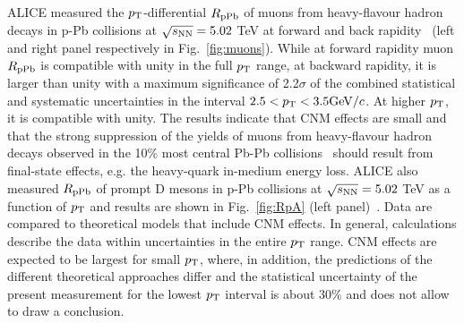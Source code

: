 ALICE measured the $p_{\rm T}$-differential $R_{\rm pPb}$ of muons from heavy-flavour hadron decays in p-Pb collisions at $\sqrt{s_{\rm NN}} = 5.02$ TeV
at forward and back rapidity~\cite{Acharya:2017hdv} (left and right panel respectively in Fig.~\ref{fig:muons}).
While at forward rapidity muon $R_{\rm pPb}$ is compatible with unity in the full $p_{\rm T}$ range, 
at backward rapidity, it is larger than unity with a maximum 
significance of 2.2$\sigma$ of the combined statistical and systematic uncertainties in the interval $2.5 < p_{\rm T} < 3.5 \mathrm{GeV}/c$. 
At higher $p_{\rm T}$, it is compatible with unity. The results indicate
that CNM effects are small and that the strong suppression of the
yields of muons from heavy-flavour hadron decays observed in the
10\% most central Pb-Pb collisions~\cite{Abelev:2012qh} should result from final-state
effects, e.g. the heavy-quark in-medium energy loss. 
ALICE also measured $R_{\rm pPb}$ of prompt D mesons in p-Pb collisions at $\sqrt{s_{\rm NN}} = 5.02$ TeV
as a function of $p_{\rm T}$ and results are shown in Fig.~\ref{fig:RpA} (left panel)~\cite{ALICEPAS2017008}. Data are compared to 
theoretical models that include CNM effects. In general, calculations describe the data within 
uncertainties in the entire $p_{\rm T}$ range. CNM effects are expected to be largest for small $p_{\rm T}$, 
where, in addition, the predictions of the different theoretical approaches differ and the statistical 
uncertainty of the present measurement for the lowest $p_{\rm T}$ interval is about 30\% and does not 
allow to draw a conclusion. \\


